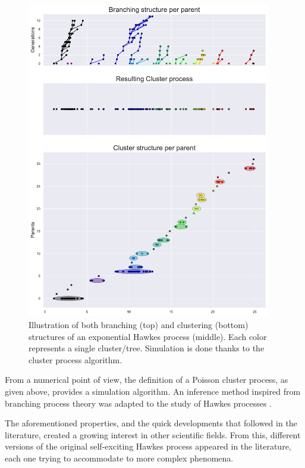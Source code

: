     \begin{figure}[!ht]
      \centering
        \includegraphics[width=0.95\textwidth]{images/chapter0/branching_and_cluster05.pdf}
      \caption{Illustration of both branching (top) and clustering (bottom) structures of an exponential Hawkes process (middle). Each color represents a single cluster/tree. Simulation is done thanks to the cluster process algorithm.
      }
      \label{fig:branching_and_cluster05}
    \end{figure}

    From a numerical point of view, the definition of a Poisson cluster process, as given above, provides a simulation algorithm. An inference method inspired from branching process theory was adapted to the study of Hawkes processes \parencite{Veen2008}.

    The aforementioned properties, and the quick developments that followed in the literature, created a growing interest in other scientific fields.
    From this, different versions of the original self-exciting Hawkes process appeared in the literature, each one trying to accommodate to more complex phenomena.

